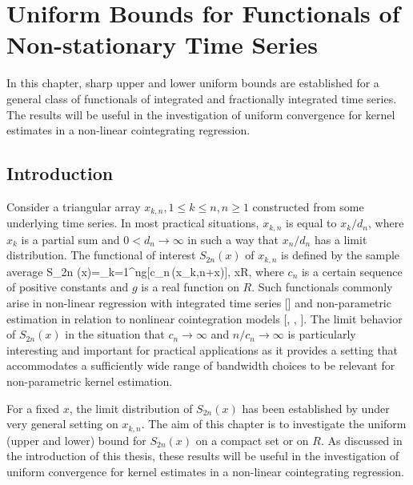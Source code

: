 
\chapter{Uniform Bounds for Functionals of Non-stationary Time Series} 
\ifpdf
    \graphicspath{{Chapter2/Chapter2Figs/PNG/}{Chapter2/Chapter2Figs/PDF/}{Chapter2/Chapter2Figs/}}
\else
    \graphicspath{{Chapter2/Chapter2Figs/EPS/}{Chapter2/Chapter2Figs/}}
\fi

In this chapter, sharp upper and lower uniform bounds are established for a general class of functionals of integrated and fractionally integrated time series. The results will be useful in the investigation of uniform convergence for kernel estimates in a non-linear cointegrating regression.

\section{Introduction}
Consider a triangular array ${x_{k,n},1\leq k\leq n,n\geq
1}$ constructed from some underlying time series.
In most practical situations, $x_{k,n}$ is equal to $x_k/d_n$, where $x_k$
is a partial sum and $0 < d_n\to \infty$ in such a way that $x_n/d_n$ has a limit distribution.  The functional of interest $
S_{2n}(x)$ of $x_{k,n}$ is defined by the sample average
\bestar
S_{2n} (x)=\sum_{k=1}^{n}g[c_{n}\,(x_{k,n}+x)], \quad x\in R,
\eestar
where $c_{n}$ is a certain sequence of positive constants and $g$ is
a real function on $R$. Such functionals commonly arise in
non-linear regression with integrated time series [\citet[][\citeyear{parkphillips2001}]{parkphillips1999}] and non-parametric estimation in relation to nonlinear cointegration models [\cite{phillipspark1998}, \cite{karlsentjostheim2001}, \citet[][\citeyear{wangphillips2010a}, \citeyear{wangphillips2010b}]{wangphillips2009}]. The limit
behavior of $S_{2n}(x)$ in the situation that $c_{n}\rightarrow \infty $ and $%
n/c_{n}\rightarrow \infty $ is particularly interesting and
important for practical applications as it provides a setting that
accommodates a sufficiently wide range of bandwidth choices to be
relevant for non-parametric kernel estimation.

For a fixed $x$, the limit distribution of $S_{2n}(x)$ has been established by \citet[][\citeyear{wangphillips2010a}, \citeyear{wangphillips2010b}]{wangphillips2009} under very general setting on $x_{k,n}$. The aim of this chapter is to investigate the uniform (upper and lower) bound  for $S_{2n}(x)$ on a compact set or on $R$. As discussed in the introduction of this thesis, these results will be useful in the investigation of uniform convergence for kernel estimates in a non-linear cointegrating regression.

